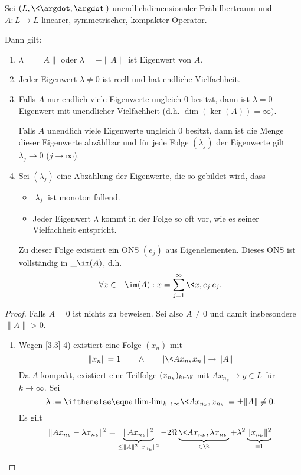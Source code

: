 \begin{st} \label{3.5}
	Sei $(L, \<\argdot,\argdot\>)$ unendlichdimensionaler Prähilbertraum und $A: L \to L$ linearer, symmetrischer, kompakter Operator.

	Dann gilt:
	\begin{enumerate}[1)]
		\item
			$\lambda = \|A \|$ oder $\lambda = - \|A\|$ ist Eigenwert von $A$.
		\item
			Jeder Eigenwert $\lambda \neq 0$ ist reell und hat endliche Vielfachheit.
		\item
			Falls $A$ nur endlich viele Eigenwerte ungleich $0$ besitzt, dann ist $\lambda = 0$ Eigenwert mit unendlicher Vielfachheit (d.h. $\dim (\ker (A)) = \infty)$.

			Falls $A$ unendlich viele Eigenwerte ungleich $0$ besitzt, dann ist die Menge dieser Eigenwerte abzählbar und für jede Folge $(\lambda_j)$ der Eigenwerte gilt $\lambda_j \to 0$ ($j \to \infty$).
		\item
			Sei $(\lambda_j)$ eine Abzählung der Eigenwerte, die so gebildet wird, dass
			\begin{itemize}
				\item
					$|\lambda_j|$ ist monoton fallend.
				\item
					Jeder Eigenwert $\lambda$ kommt in der Folge so oft vor, wie es seiner Vielfachheit entspricht.
			\end{itemize}
			Zu dieser Folge existiert ein ONS $(e_j)$ aus Eigenelementen.
			Dieses ONS ist vollständig in $\_{\im (A)}$, d.h.
			\[
				\forall x \in \_{\im(A)} : x = \sum_{j=1}^\infty \<x,e_j\> e_j.
			\]
	\end{enumerate}
	\begin{proof}
		Falls $A = 0$ ist nichts zu beweisen.
		Sei also $A \neq 0$ und damit insbesondere $\|A\| > 0$.
		\begin{enumerate}[1)]
			\item
				Wegen \ref{3.3} 4) existiert eine Folge $(x_n)$ mit
				\[
					\|x_n\| = 1 \qquad \land \qquad |\<Ax_n,x_n\>| \to \|A\|
				\]
				Da $A$ kompakt, existiert eine Teilfolge $(x_{n_k})_{k\in \N}$ mit $Ax_{n_k} \to y \in L$ für $k \to \infty$.
				Sei 
				\[
					\lambda := \lim_{k\to\infty} \<Ax_{n_k},x_{n_k}\> = \pm \|A\| \neq 0.
				\]
				Es gilt
				\begin{align*}
					\|Ax_{n_k} - \lambda x_{n_k}\|^2
					&= \underbrace{\|Ax_{n_k} \|^2}_{\le \|A\|^2 \|x_{n_k}\|^2} - 2 \Re \underbrace{\< Ax_{n_k}, \lambda x_{n_k} \>}_{\in \R} + \lambda^2 \underbrace{\|x_{n_k}\|^2}_{=1} \\

\end{align*}
\end{enumerate}
\end{proof}
\end{st}
